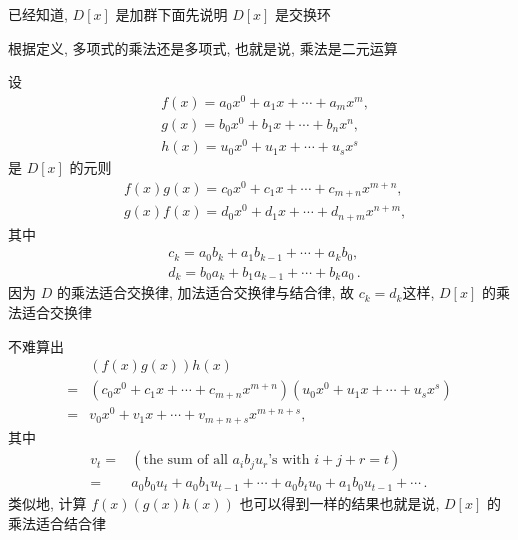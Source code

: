 \begin{pf}
    已经知道, $D[x]$ 是加群\period 下面先说明 $D[x]$ 是交换环\period

    根据定义, 多项式的乘法还是多项式, 也就是说, 乘法是二元运算\period

    设
    \begin{align*}
         & f(x) = a_0 x^0 + a_1 x + \cdots + a_m x^m, \\
         & g(x) = b_0 x^0 + b_1 x + \cdots + b_n x^n, \\
         & h(x) = u_0 x^0 + u_1 x + \cdots + u_s x^s
    \end{align*}
    是 $D[x]$ 的元\period 则
    \begin{align*}
         & f(x) g(x) = c_0 x^0 + c_1 x + \cdots + c_{m+n} x^{m+n}, \\
         & g(x) f(x) = d_0 x^0 + d_1 x + \cdots + d_{n+m} x^{n+m},
    \end{align*}
    其中
    \begin{align*}
         & c_k = a_0 b_k + a_1 b_{k-1} + \cdots + a_k b_0,        \\
         & d_k = b_0 a_k + b_1 a_{k-1} + \cdots + b_k a_0 \period
    \end{align*}
    因为 $D$ 的乘法适合交换律, 加法适合交换律与结合律, 故 $c_k = d_k$\period 这样, $D[x]$ 的乘法适合交换律\period

    不难算出
    \begin{align*}
             & (f(x) g(x)) h(x)                                                                  \\
        = {} & (c_0 x^0 + c_1 x + \cdots + c_{m+n} x^{m+n}) (u_0 x^0 + u_1 x + \cdots + u_s x^s) \\
        = {} & v_0 x^0 + v_1 x + \cdots + v_{m+n+s} x^{m+n+s},
    \end{align*}
    其中
    \begin{align*}
        v_t
        = {} & (\text{the sum of all $a_i b_j u_r$'s with $i+j+r=t$})                                  \\
        = {} & a_0 b_0 u_t + a_0 b_1 u_{t-1} + \cdots + a_0 b_t u_0 + a_1 b_0 u_{t-1} + \cdots \period
    \end{align*}
    类似地, 计算 $f(x) (g(x) h(x))$ 也可以得到一样的结果\period 也就是说, $D[x]$ 的乘法适合结合律\period


\end{pf}
